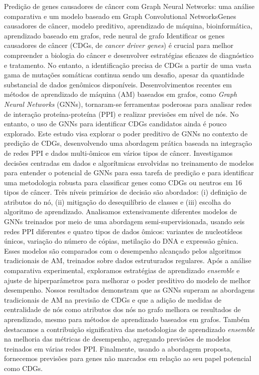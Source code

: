 \documentclass[ppgc, diss, english]{iiufrgs}
\begin{document}
\begin{englishabstract}{Predição de genes causadores de câncer com Graph Neural Networks: uma análise comparativa e um modelo baseado em Graph Convolutional Networks}{Genes causadores de câncer, modelo preditivo, aprendizado de máquina, bioinformática, aprendizado baseado em grafos, rede neural de grafo}
Identificar os genes causadores de câncer (CDGs, de \textit{cancer driver genes}) é crucial para melhor compreender a biologia do câncer e desenvolver estratégias eficazes de diagnóstico e tratamento. No entanto, a identificação precisa de CDGs a partir de uma vasta gama de mutações somáticas continua sendo um desafio, apesar da quantidade substancial de dados genômicos disponíveis. Desenvolvimentos recentes em métodos de aprendizado de máquina (AM) baseados em grafos, como \textit{Graph Neural Networks} (GNNs), tornaram-se ferramentas poderosas para analisar redes de interação proteína-proteína (PPI) e realizar previsões em nível de nós. No entanto, o uso de GNNs para identificar CDGs candidatos ainda é pouco explorado. Este estudo visa explorar o poder preditivo de GNNs no contexto de predição de CDGs, desenvolvendo uma abordagem prática baseada na integração de redes PPI e dados multi-ômicos em vários tipos de câncer. Investigamos decisões centradas em dados e algorítmicas envolvidas no treinamento de modelos para entender o potencial de GNNs para essa tarefa de predição e para identificar uma metodologia robusta para classificar genes como CDGs ou neutros em 16 tipos de câncer. Três níveis primários de decisão são abordados: (i) definição de atributos do nó, (ii) mitigação do desequilíbrio de classes e (iii) escolha do algoritmo de aprendizado. 
Analisamos extensivamente diferentes modelos de GNNs treinados por meio de uma abordagem semi-supervisionada, usando seis redes PPI diferentes e quatro tipos de dados ômicos: variantes de nucleotídeos únicos, variação do número de cópias, metilação do DNA e expressão gênica. Esses modelos são comparados com o desempenho alcançado pelos algoritmos tradicionais de AM, treinados sobre dados estruturados regulares. Após a análise comparativa experimental, exploramos estratégias de aprendizado \textit{ensemble} e ajuste de hiperparâmetros para melhorar o poder preditivo do modelo de melhor desempenho. 
Nossos resultados demonstram que as GNNs superam as abordagens tradicionais de AM na previsão de CDGs e que a adição de medidas de centralidade de nós como atributos dos nós no grafo melhora os resultados de aprendizado, mesmo para métodos de aprendizado baseados em grafos. Também destacamos a contribuição significativa das metodologias de aprendizado \textit{ensemble} na melhoria das métricas de desempenho, agregando previsões de modelos treinados em várias redes PPI. Finalmente, usando a abordagem proposta, fornecemos previsões para genes não marcados em relação ao seu papel potencial como CDGs. 

\end{englishabstract}
\end{document}
